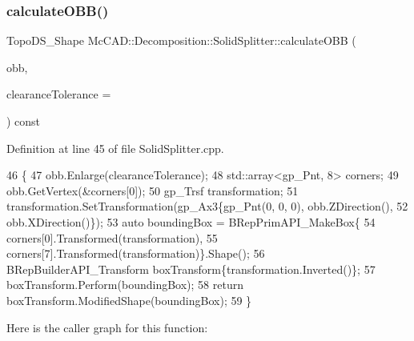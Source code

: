 \mbox{\label{classMcCAD_1_1Decomposition_1_1SolidSplitter_a24c086a0f489167076acfee3bd61d991}} 
\subsubsection{\texorpdfstring{calculate\+O\+B\+B()}{calculateOBB()}\hspace{0.1cm}{\footnotesize\ttfamily [2/2]}}
{\footnotesize\ttfamily Topo\+D\+S\+\_\+\+Shape Mc\+C\+A\+D\+::\+Decomposition\+::\+Solid\+Splitter\+::calculate\+O\+BB (\begin{DoxyParamCaption}\item[{Bnd\+\_\+\+O\+BB}]{obb,  }\item[{Standard\+\_\+\+Real}]{clearance\+Tolerance = {} }\end{DoxyParamCaption}) const}



Definition at line 45 of file Solid\+Splitter.\+cpp.


\begin{DoxyCode}
46                                                             \{
47     obb.Enlarge(clearanceTolerance);
48     std::array<gp\_Pnt, 8> corners;
49     obb.GetVertex(&corners[0]);
50     gp\_Trsf transformation;
51     transformation.SetTransformation(gp\_Ax3\{gp\_Pnt(0, 0, 0), obb.ZDirection(),
52                                             obb.XDirection()\});
53     \textcolor{keyword}{auto} boundingBox = BRepPrimAPI\_MakeBox\{
54             corners[0].Transformed(transformation),
55             corners[7].Transformed(transformation)\}.Shape();
56     BRepBuilderAPI\_Transform boxTransform\{transformation.Inverted()\};
57     boxTransform.Perform(boundingBox);
58     \textcolor{keywordflow}{return} boxTransform.ModifiedShape(boundingBox);
59 \}
\end{DoxyCode}
Here is the caller graph for this function\+:
\mbox{\label{classMcCAD_1_1Decomposition_1_1SolidSplitter_a5d2f4d3aab2322de064fd5e1e0dc5a1e}} 
